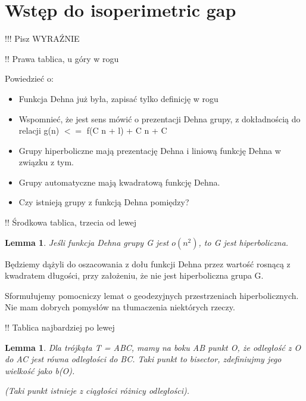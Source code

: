 \documentclass[twoside]{article}
\newcounter{lecnum}
\newcommand{\lecture}[4]{
   \pagestyle{myheadings}
   \thispagestyle{plain}
   \newpage
   \setcounter{lecnum}{#1}
   \setcounter{page}{1}
   \noindent
   \begin{center}
   \framebox{
      \vbox{\vspace{2mm}
    \hbox to 6.28in { {\bf 10-725: Optimization
	\hfill Fall 2012} }
       \vspace{4mm}
       \hbox to 6.28in { {\Large \hfill Lecture #1: #2  \hfill} }
       \vspace{2mm}
       \hbox to 6.28in { {\it Lecturer: #3 \hfill Scribes: #4} }
      \vspace{2mm}}
   }
   \end{center}
   \markboth{Lecture #1: #2}{Lecture #1: #2}

   {\bf Note}: {\it Template.}

   \vspace*{4mm}
}
\newtheorem{lemma}[theorem]{Lemma}
\begin{document}



\section{Wstęp do isoperimetric gap} %

!!! Pisz WYRAŹNIE

!! Prawa tablica, u góry w rogu

Powiedzieć o:
\begin{itemize}

\item Funkcja Dehna już była, zapisać tylko definicję w rogu
\item Wspomnieć, że jest sens mówić o prezentacji Dehna grupy, z dokładnością do relacji g(n) $<=$ f(C n + l) + C n + C
\item Grupy hiperboliczne mają prezentację Dehna i liniową funkcję Dehna w związku z tym.
\item Grupy automatyczne mają kwadratową funkcję Dehna.
\item Czy istnieją grupy z funkcją Dehna pomiędzy?

\end{itemize}

!! Środkowa tablica, trzecia od lewej

\begin{lemma}
Jeśli funkcja Dehna grupy G jest $o(n^2)$, to G jest hiperboliczna.
\end{lemma}

Będziemy dążyli do oszacowania z dołu funkcji Dehna przez wartość rosnącą z kwadratem długości, przy założeniu, że nie jest hiperboliczna grupa G.

Sformułujemy pomocniczy lemat o geodezyjnych przestrzeniach hiperbolicznych. Nie mam dobrych pomysłów na tłumaczenia niektórych rzeczy.

!! Tablica najbardziej po lewej

\begin{lemma}

Dla trójkąta T = ABC, mamy na boku AB punkt O, że odległość z O do AC jest równa odległości do BC. Taki punkt to bisector, zdefiniujmy jego wielkość jako b(O).

(Taki punkt istnieje z ciągłości różnicy odległości).

\end{lemma}
\end{document}
